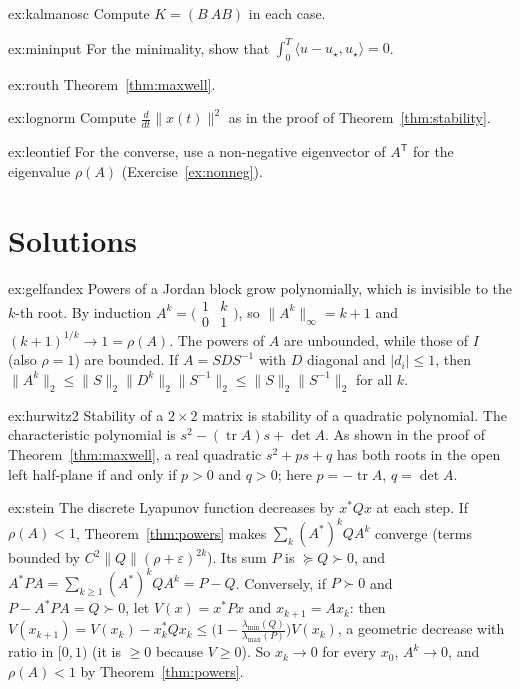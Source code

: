 \begin{hint}{ex:kalmanosc}
Compute $K=(B\ AB)$ in each case.
\end{hint}
\begin{hint}{ex:mininput}
For the minimality, show that $\int_0^T\langle u-u_\star,u_\star\rangle=0$.
\end{hint}
\begin{hint}{ex:routh}
Theorem~\ref{thm:maxwell}.
\end{hint}
\begin{hint}{ex:lognorm}
Compute $\frac d{dt}\|x(t)\|^2$ as in the proof of Theorem~\ref{thm:stability}.
\end{hint}
\begin{hint}{ex:leontief}
For the converse, use a non-negative eigenvector of $A^{\mathsf T}$ for the eigenvalue $\rho(A)$ (Exercise~\ref{ex:nonneg}).
\end{hint}

\section{Solutions}

\begin{solution}{ex:gelfandex}
\idea Powers of a Jordan block grow polynomially, which is invisible to the $k$-th root.
\writeup By induction $A^k=\bigl(\begin{smallmatrix}1&k\\0&1\end{smallmatrix}\bigr)$, so $\|A^k\|_\infty=k+1$ and $(k+1)^{1/k}\to1=\rho(A)$. The
powers of $A$ are unbounded, while those of $I$ (also $\rho=1$) are bounded. If $A=SDS^{-1}$ with $D$ diagonal and $|d_i|\le1$, then
$\|A^k\|_2\le\|S\|_2\|D^k\|_2\|S^{-1}\|_2\le\|S\|_2\|S^{-1}\|_2$ for all $k$.
\end{solution}

\begin{solution}{ex:hurwitz2}
\idea Stability of a $2\times2$ matrix is stability of a quadratic polynomial.
\writeup The characteristic polynomial is $s^2-(\operatorname{tr}A)s+\det A$. As shown in the proof of Theorem~\ref{thm:maxwell}, a real
quadratic $s^2+ps+q$ has both roots in the open left half-plane if and only if $p>0$ and $q>0$; here $p=-\operatorname{tr}A$, $q=\det A$.
\end{solution}

\begin{solution}{ex:stein}
\idea The discrete Lyapunov function decreases by $x^*Qx$ at each step.
\writeup If $\rho(A)<1$, Theorem~\ref{thm:powers} makes $\sum_k(A^*)^kQA^k$ converge (terms bounded by $C^2\|Q\|(\rho+\varepsilon)^{2k}$). Its sum
$P$ is $\succeq Q\succ0$, and $A^*PA=\sum_{k\ge1}(A^*)^kQA^k=P-Q$. Conversely, if $P\succ0$ and $P-A^*PA=Q\succ0$, let $V(x)=x^*Px$ and $x_{k+1}=
Ax_k$: then $V(x_{k+1})=V(x_k)-x_k^*Qx_k\le\bigl(1-\frac{\lambda_{\min}(Q)}{\lambda_{\max}(P)}\bigr)V(x_k)$, a geometric decrease with ratio
in $[0,1)$ (it is $\ge0$ because $V\ge0$). So $x_k\to0$ for every $x_0$, $A^k\to0$, and $\rho(A)<1$ by Theorem~\ref{thm:powers}.
\end{solution}


